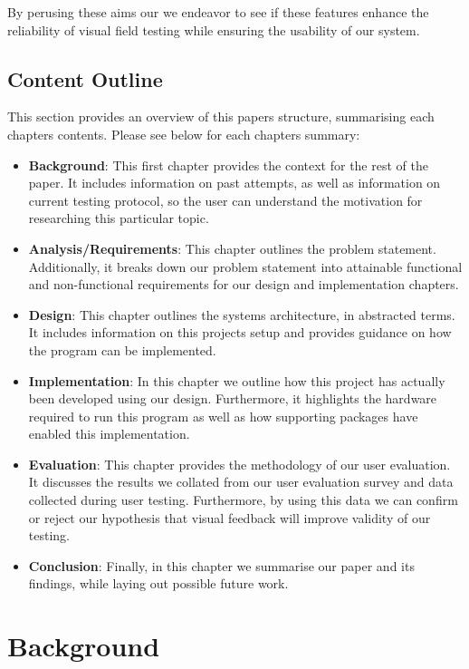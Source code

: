 \documentclass{l4proj}
\begin{document}
By perusing these aims our we endeavor to see if these features enhance the reliability of visual field testing while ensuring the usability of our system.
\section{Content Outline}
This section provides an overview of this papers structure, summarising each chapters contents. Please see below for each chapters summary:
\begin{itemize}
    \item \textbf{Background}: This first chapter provides the context for the rest of the paper. It includes information on past attempts, as well as information on current testing protocol, so the user can understand the motivation for researching this particular topic.
    \item \textbf{Analysis/Requirements}: This chapter outlines the problem statement. Additionally, it breaks down our problem statement into attainable functional and non-functional requirements for our design and implementation chapters.
    \item \textbf{Design}: This chapter outlines the systems architecture, in abstracted terms. It includes information on this projects setup and provides guidance on how the program can be implemented.
    \item \textbf{Implementation}: In this chapter we outline how this project has actually been developed using our design. Furthermore, it highlights the hardware required to run this program as well as how supporting packages have enabled this implementation.
    \item \textbf{Evaluation}: This chapter provides the methodology of our user evaluation. It discusses the results we collated from our user evaluation survey and data collected during user testing. Furthermore, by using this data we can confirm or reject our hypothesis that visual feedback will improve validity of our testing.
    \item \textbf{Conclusion}: Finally, in this chapter we summarise our paper and its findings, while laying out possible future work.
\end{itemize}



\chapter{Background}
\end{document}
